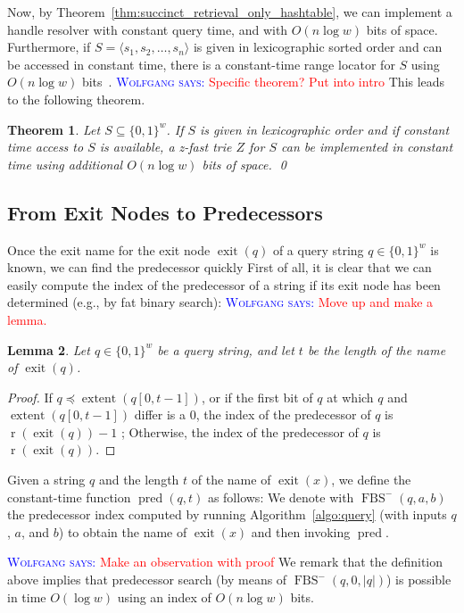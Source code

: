 \documentclass[a4paper,11pt]{article}
\newtheorem{theorem}{Theorem}[section]
\newtheorem{lemma}[theorem]{Lemma}
\newcommand{\?}{\mskip1.5mu}
\DeclareMathOperator{\exit}{exit}
\DeclareMathOperator{\rrange}{r}
\DeclareMathOperator{\extent}{extent}
\DeclareMathOperator{\pred}{pred}
\DeclareMathOperator{\fbs}{FBS}
\newcommand{\aremark}[3]{\textcolor{blue}{\textsc{#1 #2:}}
  \textcolor{red}{\textsf{#3}}}
\newcommand{\wolfgang}[2][says]{\aremark{Wolfgang}{#1}{#2}}
\begin{document}
Now, by Theorem~\ref{thm:succinct_retrieval_only_hashtable},
we can implement a handle resolver with constant 
query time, and with $O(n \log w)$ bits of 
space.  Furthermore, if $S = \langle s_1, s_2, \dots, s_n\rangle$ 
is given in lexicographic sorted order and can be accessed in
constant time,
there is a constant-time range locator for $S$ using $O(n\log w)$
bits~\cite{BelazzouguiBoPaVi09}.
\wolfgang{Specific theorem? Put into intro}
This leads to the following theorem.

\begin{theorem}
\label{th:zfast}
Let $S \subseteq \{0, 1\}^w$.
If $S$ is given in lexicographic order and if constant time
access to $S$ is available, a z-fast trie $Z$ for $S$ can be
implemented in constant time using additional $O(n\log w)$ bits of space.
\qed
\end{theorem}

\subsection{From Exit Nodes to Predecessors}

Once the exit name for the exit node $\exit(q)$ of a query 
string $q \in \{0, 1\}^w$ is known, we can find the predecessor quickly
First of all, it is clear that we can easily compute the index of 
the predecessor of a string if its exit node has been determined 
(e.g., by fat binary search): 
\wolfgang{Move up and make a lemma.}

\begin{lemma}
Let $q \in \{0, 1\}^w$ be a query string, and
let $t$ be the length of the name of $\exit(q)$.
\end{lemma}
\begin{proof}
  If $q \preceq \extent(q[0, t - 1])$, or if the first bit of 
    $q$ at which $q$ and $\extent(q[0, t-1])$ differ is a $0$, 
    the index of the predecessor of $q$ is $\rrange(\exit(q))-1$ ;
  Otherwise, the index of the predecessor of $q$ is 
    $\rrange(\exit(q))$.
\end{proof}
Given a string $q$ and the length $t$ of the name of $\exit(x)$, 
we define the constant-time function $\pred(q, t)$
as follows:
 We denote with $\fbs^-(q,a,b)$ the predecessor index computed by 
 running Algorithm~\ref{algo:query} (with inputs $q$, $a$, and $b$) 
 to obtain the name of $\exit(x)$ and then invoking $\pred$.


\wolfgang{Make an observation with proof}
We remark that the definition above implies that predecessor search
(by means of $\fbs^-(q,0,|q|)$) is possible in time $O(\log w)$ 
using an index of $O(n\log w)$ bits.
\end{document}
